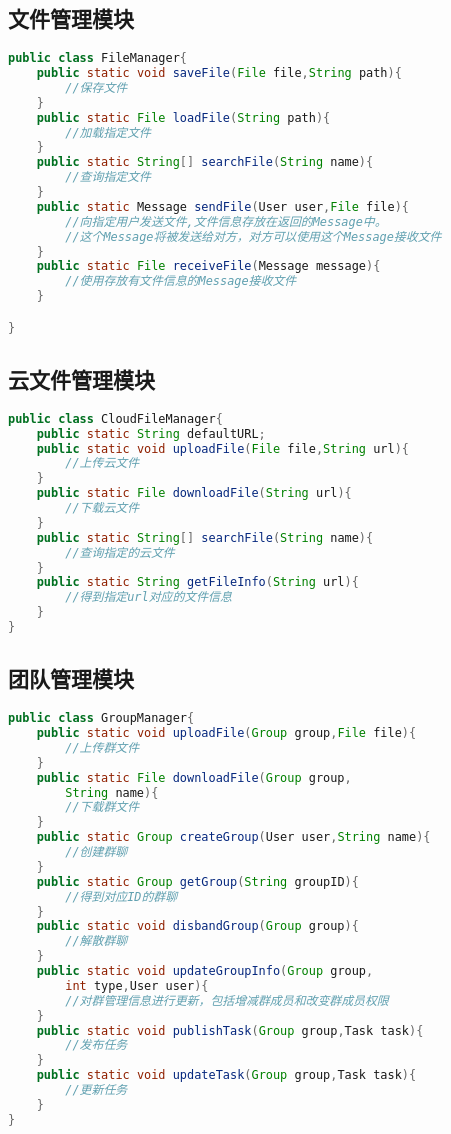 \subsection{文件管理模块}
\begin{lstlisting}[language=Java, caption=文件管理模块接口]
public class FileManager{
    public static void saveFile(File file,String path){
        //保存文件
    }
    public static File loadFile(String path){
        //加载指定文件
    }
    public static String[] searchFile(String name){
        //查询指定文件
    }
    public static Message sendFile(User user,File file){
        //向指定用户发送文件,文件信息存放在返回的Message中。
        //这个Message将被发送给对方，对方可以使用这个Message接收文件
    }
    public static File receiveFile(Message message){
        //使用存放有文件信息的Message接收文件
    }

}
\end{lstlisting}

\subsection{云文件管理模块}
\begin{lstlisting}[language=Java, caption=云文件管理模块接口]
public class CloudFileManager{
    public static String defaultURL;
    public static void uploadFile(File file,String url){
        //上传云文件
    }
    public static File downloadFile(String url){
        //下载云文件
    }
    public static String[] searchFile(String name){
        //查询指定的云文件
    }
    public static String getFileInfo(String url){
        //得到指定url对应的文件信息
    }
}
\end{lstlisting}

\subsection{团队管理模块}
\begin{lstlisting}[language=Java, caption=团队管理模块接口]
public class GroupManager{
    public static void uploadFile(Group group,File file){
        //上传群文件
    }
    public static File downloadFile(Group group,
        String name){
        //下载群文件
    }
    public static Group createGroup(User user,String name){
        //创建群聊
    }
    public static Group getGroup(String groupID){
        //得到对应ID的群聊
    }
    public static void disbandGroup(Group group){
        //解散群聊
    }
    public static void updateGroupInfo(Group group,
        int type,User user){
        //对群管理信息进行更新，包括增减群成员和改变群成员权限
    }
    public static void publishTask(Group group,Task task){
        //发布任务
    }
    public static void updateTask(Group group,Task task){
        //更新任务
    }
}
\end{lstlisting}

